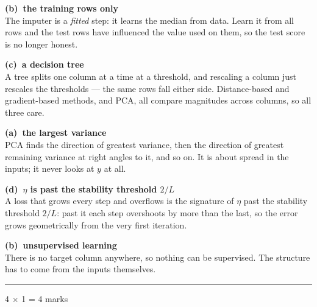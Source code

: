 \documentclass[10pt,a4paper]{article}
\newcommand{\parthead}[2]{\vspace{2pt}\noindent\rule{\linewidth}{0.4pt}\par\vspace{2pt}%
  \noindent{\bfseries Part #1}\hfill{\small #2}\par\vspace{1pt}}
\newcommand{\sol}[1]{\textbf{#1}}
\begin{document}
\begin{sA}

  \item \sol{(b)\ the training rows only}\\ The imputer is a \emph{fitted} step: it learns the median from data. Learn it from all rows and the test rows have influenced the value used on them, so the test score is no longer honest.

  \item \sol{(c)\ a decision tree}\\ A tree splits one column at a time at a threshold, and rescaling a column just rescales the thresholds --- the same rows fall either side. Distance-based and gradient-based methods, and PCA, all compare magnitudes across columns, so all three care.

  \item \sol{(a)\ the largest variance}\\ PCA finds the direction of greatest variance, then the direction of greatest remaining variance at right angles to it, and so on. It is about spread in the inputs; it never looks at $y$ at all.

  \item \sol{(d)\ $\eta$ is past the stability threshold $2/L$}\\ A loss that grows every step and overflows is the signature of $\eta$ past the stability threshold $2/L$: past it each step overshoots by more than the last, so the error grows geometrically from the very first iteration.

  \item \sol{(b)\ unsupervised learning}\\ There is no target column anywhere, so nothing can be supervised. The structure has to come from the inputs themselves.

\end{sA}

\vspace{3pt}

\parthead{B --- Fill in the blanks}{4 $\times$ 1 = 4 marks}
\end{document}

